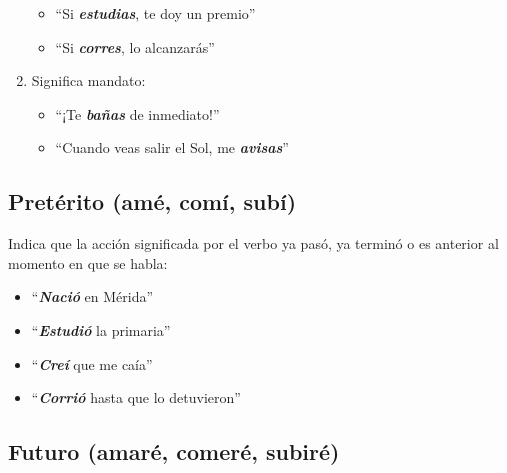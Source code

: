\documentclass[14pt]{extarticle}
\newcommand{\marcatexto}[1]{\textbf{\textit{#1}}}
\begin{document}
\begin{enumerate}[label=\alph*)]
\begin{itemize}
\item \enquote{Si \marcatexto{estudias}, te doy un premio}
\item \enquote{Si \marcatexto{corres}, lo alcanzarás}
\end{itemize}
\item Significa mandato:
\begin{itemize}
\item \enquote{¡Te \marcatexto{bañas} de inmediato!}
\item \enquote{Cuando veas salir el Sol, me \marcatexto{avisas}}
\end{itemize}
\end{enumerate}

\subsection{Pretérito (amé, comí, subí)}

Indica que la acción significada por el verbo ya pasó, ya terminó o es anterior al momento en que se habla:
\begin{itemize}
\item \enquote{\marcatexto{Nació} en Mérida}
\item \enquote{\marcatexto{Estudió} la primaria}
\item \enquote{\marcatexto{Creí} que me caía}
\item \enquote{\marcatexto{Corrió} hasta que lo detuvieron}
\end{itemize}

\subsection{Futuro (amaré, comeré, subiré)}
\end{document}
